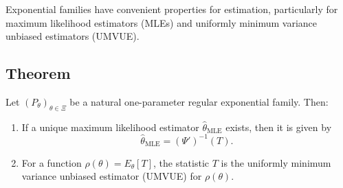 \documentclass[open=any, 11pt,paper=A4]{scrreprt}
\begin{document}
Exponential families have convenient properties for estimation, particularly for maximum likelihood estimators (MLEs) and uniformly minimum variance unbiased estimators (UMVUE).

\subsection{Theorem}

\begin{theorem}
Let $(P_\theta)_{\theta \in \Xi}$ be a natural one-parameter regular exponential family. Then:
\begin{enumerate}
    \item If a unique maximum likelihood estimator $\hat{\theta}_{\text{MLE}}$ exists, then it is given by
    \[
    \hat{\theta}_{\text{MLE}} = (\Psi')^{-1}(T).
    \]
    \item For a function $\rho(\theta) = E_\theta[T]$, the statistic $T$ is the uniformly minimum variance unbiased estimator (UMVUE) for $\rho(\theta)$.
\end{enumerate}
\end{theorem}
\end{document}
